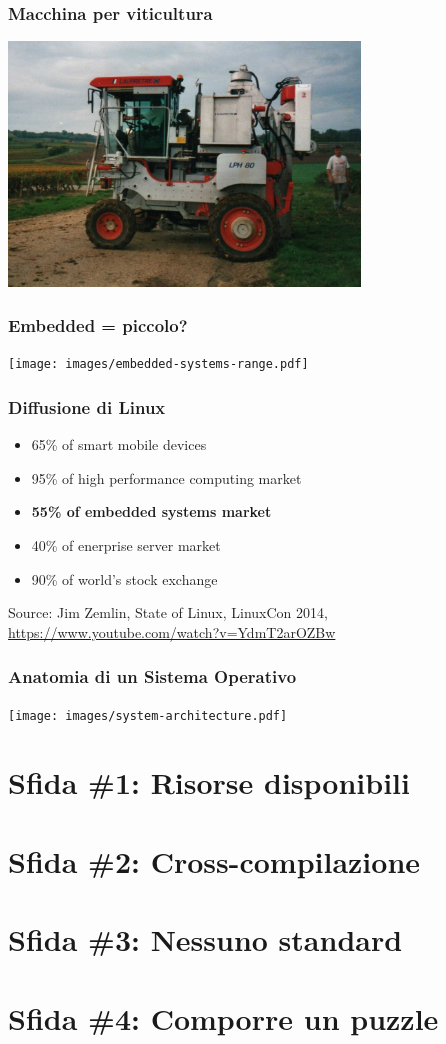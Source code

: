 \documentclass[xetex]{beamer}
\begin{document}
\begin{frame}
\frametitle{Macchina per viticultura}
  \begin{center}
    \includegraphics[width=0.7\textwidth]{images/viticulture-machine.jpg}
  \end{center}
\end{frame}

\begin{frame}
\frametitle{Embedded = piccolo?}
  \begin{center}
    \texttt{[image: images/embedded-systems-range.pdf]}
  \end{center}
\end{frame}

\begin{frame}
\frametitle{Diffusione di Linux}
  \begin{itemize}
    \item 65\% of smart mobile devices
    \item 95\% of high performance computing market
    \item \textbf{55\% of embedded systems market}
    \item 40\% of enerprise server market
    \item 90\% of world’s stock exchange
  \end{itemize}
  {\tiny Source: Jim Zemlin, State of Linux, LinuxCon 2014,
    \url{https://www.youtube.com/watch?v=YdmT2arOZBw}}
\end{frame}

\begin{frame}
\frametitle{Anatomia di un Sistema Operativo}
  \begin{center}
    \texttt{[image: images/system-architecture.pdf]}
  \end{center}
\end{frame}

\section{Sfida \#1: Risorse disponibili}

\section{Sfida \#2: Cross-compilazione}

\section{Sfida \#3: Nessuno standard}

\section{Sfida \#4: Comporre un puzzle}
\end{document}
